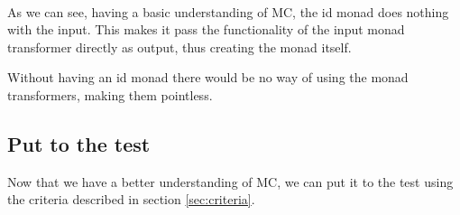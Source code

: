 \paragraph{}
As we can see, having a basic understanding of MC, the id monad does nothing with the input.
This makes it pass the functionality of the input monad transformer directly as output, thus creating the monad itself.

Without having an id monad there would be no way of using the monad transformers, making them pointless.


\subsection{Put to the test}
Now that we have a better understanding of MC, we can put it to the test using the criteria described in section \ref{sec:criteria}.

